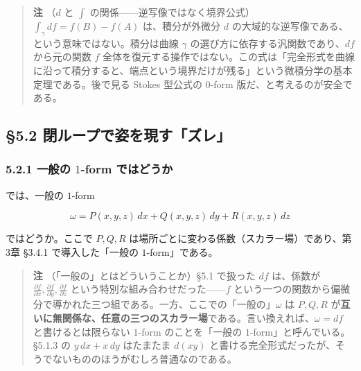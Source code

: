 \documentclass[a4paper,12pt,openany]{book}
\begin{document}
\begin{quote}
\textbf{注} （\(d\) と \(\int\)
の関係——逆写像ではなく境界公式）\(\int_\gamma df = f(B)-f(A)\)
は、積分が外微分 \(d\)
の大域的な逆写像である、という意味ではない。積分は曲線 \(\gamma\)
の選び方に依存する汎関数であり、\(df\) から元の関数 \(f\)
全体を復元する操作ではない。この式は「完全形式を曲線に沿って積分すると、端点という境界だけが残る」という微積分学の基本定理である。後で見る
Stokes 型公式の \(0\)-form 版だ、と考えるのが安全である。
\end{quote}

\par\vspace{0.35em}\par

\hypertarget{ux9589ux30ebux30fcux30d7ux3067ux59ffux3092ux73feux3059ux30baux30ec}{%
\subsection{§5.2
閉ループで姿を現す「ズレ」}\label{ux9589ux30ebux30fcux30d7ux3067ux59ffux3092ux73feux3059ux30baux30ec}}

\hypertarget{ux4e00ux822cux306e-1-form-ux3067ux306fux3069ux3046ux304b}{%
\subsubsection{\texorpdfstring{5.2.1 一般の \(1\)-form
ではどうか}{5.2.1 一般の 1-form ではどうか}}\label{ux4e00ux822cux306e-1-form-ux3067ux306fux3069ux3046ux304b}}

では、一般の \(1\)-form

\[\omega = P(x,y,z)\,dx + Q(x,y,z)\,dy + R(x,y,z)\,dz\]

ではどうか。ここで \(P, Q, R\)
は場所ごとに変わる係数（スカラー場）であり、第3章 §3.4.1
で導入した「一般の \(1\)-form」である。

\begin{quote}
\textbf{注} （「一般の」とはどういうことか）§5.1 で扱った \(df\)
は、係数が
\(\frac{\partial f}{\partial x}, \frac{\partial f}{\partial y}, \frac{\partial f}{\partial z}\)
という特別な組み合わせだった——\(f\)
という一つの関数から偏微分で導かれた三つ組である。一方、ここでの「一般の」\(\omega\)
は \(P, Q, R\)
が\textbf{互いに無関係な、任意の三つのスカラー場}である。言い換えれば、\(\omega = df\)
と書けるとは限らない \(1\)-form のことを「一般の
\(1\)-form」と呼んでいる。§5.1.3 の \(y\,dx + x\,dy\) はたまたま
\(d(xy)\)
と書ける完全形式だったが、そうでないもののほうがむしろ普通なのである。
\end{quote}
\end{document}
